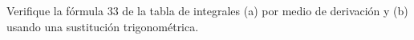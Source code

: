 \item Verifique la fórmula 33 de la tabla de integrales (a) por medio de derivación y (b) usando una sustitución trigonométrica.
